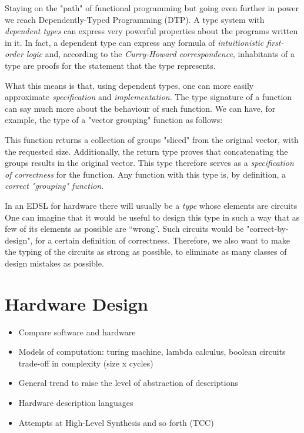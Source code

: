 \documentclass[a4paper]{article}
\begin{document}
        Staying on the "path" of functional programming but going even further in power we reach
        Dependently-Typed Programming (DTP).
        A type system with \emph{dependent types} can express very powerful properties
        about the programs written in it.
        In fact, a dependent type can express any formula of \emph{intuitionistic first-order logic} and,
        according to the \emph{Curry-Howard correspondence},
        inhabitants of a type are proofs for the statement that the type represents.

        What this means is that, using dependent types, one can more easily approximate \emph{specification} and \emph{implementation}.
        The type signature of a function can say much more about the behaviour of such function.
        We can have, for example, the type of a "vector grouping" function as follows:


        This function returns a collection of groups "sliced" from the original vector, with the requested size.
        Additionally, the return type proves that concatenating the groups results in the original vector.
        This type therefore serves as a \emph{specification of correctness} for the function.
        Any function with this type is, by definition, a \emph{correct "grouping" function}.

        In an EDSL for hardware there will usually be a \emph{type} whose elements are circuits
        One can imagine that it would be useful to design this type in such a way that as few of its elements as possible are ``wrong''.
        Such circuits would be "correct-by-design", for a certain definition of correctness.
        Therefore, we also want to make the typing of the circuits as strong as possible,
        to eliminate as many classes of design mistakes as possible.



    \section{Hardware Design}
    \label{sec:hardware}
        \begin{itemize}
            \item Compare software and hardware
            \item Models of computation: turing machine, lambda calculus, boolean circuits
                \subitem trade-off in complexity (size x cycles)

            \item General trend to raise the level of abstraction of descriptions
            \item Hardware description languages

            \item Attempts at High-Level Synthesis and so forth (TCC)
        \end{itemize}
\end{document}
